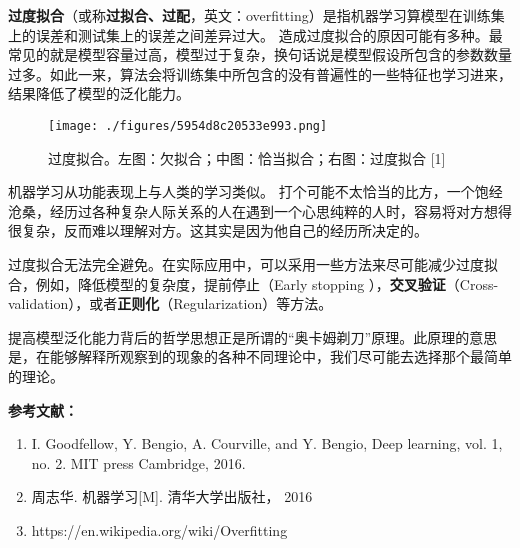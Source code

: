 
\textbf{过度拟合}（或称\textbf{过拟合、过配}，英文：overfitting）是指机器学习算模型在训练集上的误差和测试集上的误差之间差异过大。
造成过度拟合的原因可能有多种。最常见的就是模型容量过高，模型过于复杂，换句话说是模型假设所包含的参数数量过多。如此一来，算法会将训练集中所包含的没有普遍性的一些特征也学习进来，结果降低了模型的泛化能力。

\begin{figure}[ht]
\centering
\texttt{[image: ./figures/5954d8c20533e993.png]}
\caption{过度拟合。左图：欠拟合；中图：恰当拟合；右图：过度拟合 [1]} \label{fig_ovfit_1}
\end{figure}

机器学习从功能表现上与人类的学习类似。
打个可能不太恰当的比方，一个饱经沧桑，经历过各种复杂人际关系的人在遇到一个心思纯粹的人时，容易将对方想得很复杂，反而难以理解对方。这其实是因为他自己的经历所决定的。

过度拟合无法完全避免。在实际应用中，可以采用一些方法来尽可能减少过度拟合，例如，降低模型的复杂度，提前停止（Early stopping
），\textbf{交叉验证}（Cross-validation），或者\textbf{正则化}（Regularization）等方法。

提高模型泛化能力背后的哲学思想正是所谓的“奥卡姆剃刀”原理。此原理的意思是，在能够解释所观察到的现象的各种不同理论中，我们尽可能去选择那个最简单的理论。



\textbf{参考文献：}
\begin{enumerate}
\item I. Goodfellow, Y. Bengio, A. Courville, and Y. Bengio, Deep learning, vol. 1, no. 2. MIT press Cambridge, 2016.
\item 周志华. 机器学习[M]. 清华大学出版社， 2016
\item https://en.wikipedia.org/wiki/Overfitting
\end{enumerate}